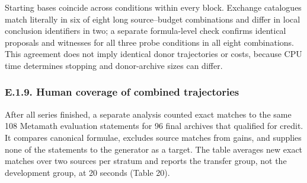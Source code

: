 \documentclass[pdflatex,sn-basic,Numbered]{sn-jnl}
\begin{document}
Starting bases coincide across conditions within every block. Exchange catalogues match literally in six of eight long source--budget combinations and differ in local conclusion identifiers in two; a separate formula-level check confirms identical proposals and witnesses for all three probe conditions in all eight combinations. This agreement does not imply identical donor trajectories or costs, because CPU time determines stopping and donor-archive sizes can differ.

\subsubsection*{E.1.9. Human coverage of combined trajectories}\label{e.1.9.-human-coverage-of-combined-trajectories}

After all series finished, a separate analysis counted exact matches to the same 108 Metamath evaluation statements for 96 final archives that qualified for credit. It compares canonical formulae, excludes source matches from gains, and supplies none of the statements to the generator as a target. The table averages new exact matches over two sources per stratum and reports the transfer group, not the development group, at 20 seconds (Table 20).

\begingroup
\small
\setlength{\tabcolsep}{3pt}
\renewcommand{\arraystretch}{1.13}
\end{document}
